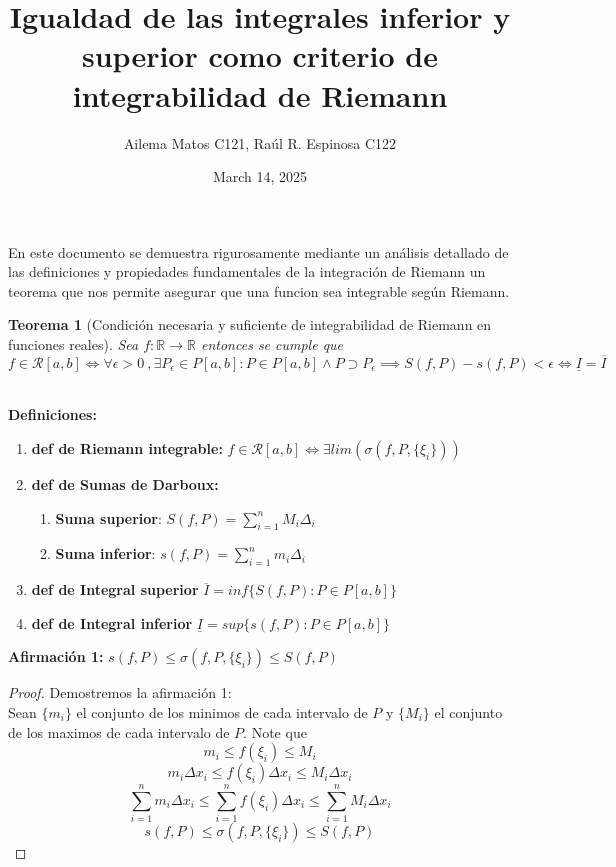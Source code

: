\documentclass{article}
\title{Igualdad de las integrales inferior y superior como criterio de integrabilidad de Riemann}
\author{
Ailema Matos C121,
Raúl R. Espinosa C122 
}
\date{March 14, 2025}
\newtheorem{theorem}{Teorema}
\begin{document}
\maketitle

\section*{}

En este documento se demuestra rigurosamente mediante un análisis detallado de las definiciones y propiedades fundamentales de la integración de Riemann 
un teorema que nos permite asegurar que una funcion sea integrable según Riemann.\\

\begin{theorem}[Condición necesaria y suficiente de integrabilidad de Riemann en funciones reales]
Sea \( f: \mathbb{R} \to \mathbb{R} \) entonces se cumple que 
\[f \in \mathcal{R}[a, b] \Longleftrightarrow \forall \epsilon>0\ ,  \exists P_\epsilon \in P[a, b]: P \in P[a, b] \wedge P \supset P_\epsilon \implies S(f, P) - s(f, P) < \epsilon \Longleftrightarrow \underline{I} = \overline{I}\]\\
\end{theorem}

\textbf{Definiciones:}

\begin{enumerate}
   \item \textbf{def de Riemann integrable:} \(f \in \mathcal{R}[a, b] \Longleftrightarrow   \exists lim(\sigma(f, P,\{\xi_i\}))\)
    \item \textbf{def de Sumas de Darboux:} 
\begin{enumerate}
	\item \textbf{Suma superior}: \(S(f, P) = \sum_{i = 1}^{n} M_i\Delta_i\)
           \item \textbf{Suma inferior}: \(s(f,P) =\sum_{i = 1}^{n}m_i\Delta_i\)
\end{enumerate}
    \item \textbf{def de Integral superior}  \(\overline{I} = inf \{ S(f, P): P \in P[a, b] \} \)  
    \item \textbf{def de Integral inferior}  \(\underline{I} = sup\{ s(f, P): P \in P[a, b] \} \)
\end{enumerate} 
\textbf{Afirmación 1:} \(s(f, P) \leq \sigma(f, P,\{\xi_i\}) \leq S(f, P)\)

\begin{proof}
Demostremos la afirmación 1:\\

Sean \(\{m_i\}\) el conjunto de los minimos de cada intervalo de \(P\) y \(\{M_i\}\) el conjunto de los maximos de cada intervalo de \(P\).
Note que 
\[
m_i \leq f(\xi_i) \leq M_i
\]
\[
m_i \Delta x_i \leq f(\xi_i)\Delta x_i \leq M_i\Delta x_i
\] 
\[
\sum_{i = 1}^{n} m_i \Delta x_i \leq \sum_{i = 1}^{n} f(\xi_i)\Delta x_i \leq \sum_{i = 1}^{n} M_i\Delta x_i
\]
\[
s(f, P) \leq \sigma(f, P,\{\xi_i\}) \leq S(f, P)
\]
\end{proof}
\end{document}
